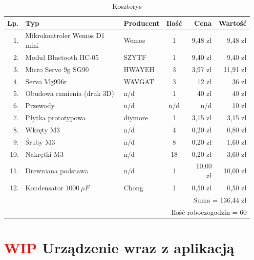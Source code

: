\documentclass[11pt,titlepage,a4paper]{article}
\begin{document}
\begin{table}[h!]
    \begin{center}
        \begin{tabular}{|r|l|l|c|r|r|}
            \hline
            Lp. & Typ                          & Producent & Ilość & Cena     & Wartość  \\
            \hline
            1.  & Mikrokontroler Wemos D1 mini & Wemos     & 1     & 9,48 zł  & 9,48 zł  \\
            2.  & Moduł Bluetooth HC-05        & SZYTF     & 1     & 9,40 zł  & 9,40 zł  \\
            3.  & Micro Servo 9g SG90          & HWAYEH    & 3     & 3,97 zł  & 11,91 zł \\
            4.  & Servo Mg996r                 & WAVGAT    & 3     & 12 zł    & 36 zł    \\
            5.  & Obudowa ramienia (druk 3D)   & n/d       & 1     & 40 zł    & 40 zł    \\
            6.  & Przewody                     & n/d       & n/d   & n/d      & 10 zł    \\
            7.  & Płytka prototypowa           & diymore   & 1     & 3,15 zł  & 3,15 zł  \\
            8.  & Wkręty M3                    & n/d       & 4     & 0,20 zł  & 0,80 zł  \\
            9.  & Śruby M3                     & n/d       & 8     & 0,20 zł  & 1,60 zł  \\
            10. & Nakrętki M3                  & n/d       & 18    & 0,20 zł  & 3,60 zł  \\
            11. & Drewniana podstawa           & n/d       & 1     & 10,00 zł & 10,00 zł \\
            12. & Kondensator $1000\ \mu F$    & Chong     & 1     & 0,50 zł  & 0,50 zł  \\
            \hline
            \multicolumn{6}{|r|}{Suma = 136,44 zł}                                       \\
            \hline
            \multicolumn{6}{|r|}{Ilość roboczogodzin = 60}                               \\
            \hline
        \end{tabular}
    \end{center}
    \caption{Kosztorys}
    \label{Kosztorys}
\end{table}

\newpage

\section{\textcolor{red}{WIP} Urządzenie wraz z aplikacją}
\end{document}
